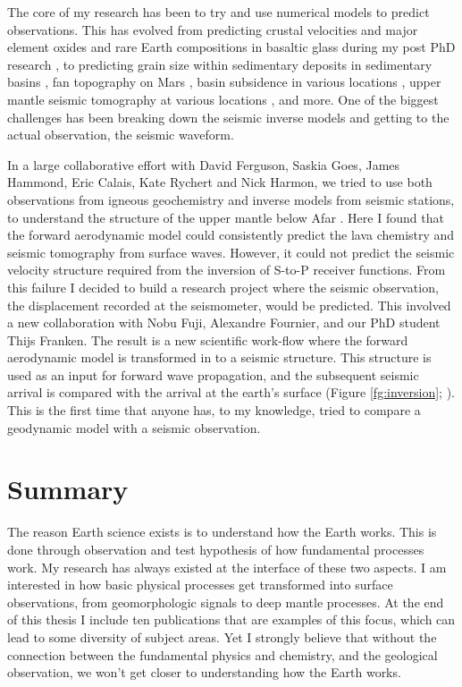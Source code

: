 The core of my research has been to try and use numerical models to predict observations. This has evolved from predicting crustal velocities and major element oxides  and rare Earth compositions in basaltic glass during my post PhD research \citep{armitage-etal-2010,armitage-etal-g3-2011}, to predicting grain size within sedimentary deposits in sedimentary basins \citep[e.g.][]{armitage-etal-ngeo-2011,armitage-etal-2015,armitage-etal-br-2018}, fan topography on Mars \citep{armitage-etal-grl-2011}, basin subsidence in various locations \citep[e.g.][]{armitage-2010,armitage-etal-jgr-2013,petersen-etal-2015}, upper mantle seismic tomography at various locations \citep[e.g.][]{goes-etal-2012,armitage-etal-2015}, and more. One of the biggest challenges has been breaking down the seismic inverse models and getting to the actual observation, the seismic waveform.

In a large collaborative effort with David Ferguson, Saskia Goes, James Hammond, Eric Calais, Kate Rychert and Nick Harmon, we tried to use both observations from igneous geochemistry and inverse models from seismic stations, to understand the structure of the upper mantle below Afar \citep{armitage-etal-epsl-2015}. Here I found that the forward aerodynamic model could consistently predict the lava chemistry and seismic tomography from surface waves. However, it could not predict the seismic velocity structure required from the inversion of S-to-P receiver functions. From this failure I decided to build a research project where the seismic observation, the displacement recorded at the seismometer, would be predicted. This involved a new collaboration with Nobu Fuji, Alexandre Fournier, and our PhD student Thijs Franken. The result is a new scientific work-flow where the forward aerodynamic model is transformed in to a seismic structure. This structure is used as an input for forward wave propagation, and the subsequent seismic arrival is compared with the arrival at the earth's surface (Figure \ref{fg:inversion}; \citealp{franken-etal-2020}). This is the first time that anyone has, to my knowledge, tried to compare a geodynamic model with a seismic observation.

\section{Summary}

The reason Earth science exists is to understand how the Earth works. This is done through observation and test hypothesis of how fundamental processes work. My research has always existed at the interface of these two aspects. I am interested in how basic physical processes get transformed into surface observations, from geomorphologic signals to deep mantle processes. At the end of this thesis I include ten publications that are examples of this focus, which can lead to some diversity of subject areas. Yet I strongly believe that without the connection between the fundamental physics and chemistry, and the geological observation, we won't get closer to understanding how the Earth works. 
